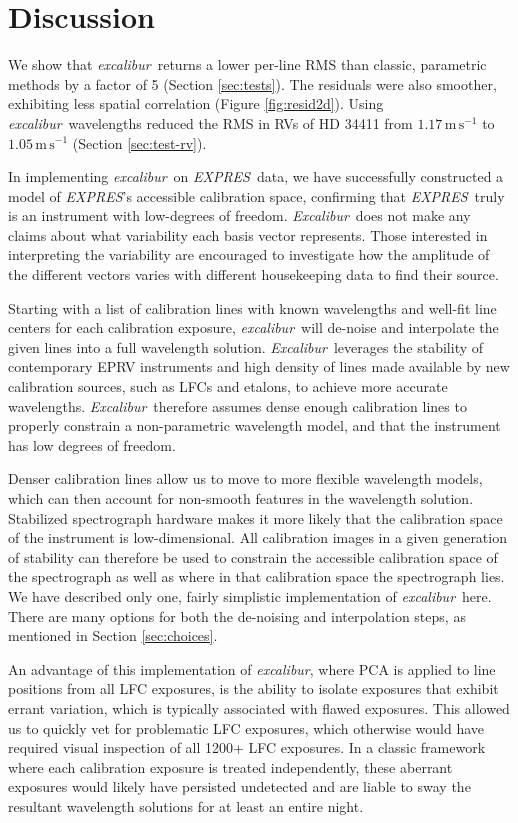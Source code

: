 \documentclass[twocolumn,table,xcolor,trackchanges]{aastex63}
\newcommand{\project}[1]{\textsl{#1}}
\newcommand{\name}{\project{excalibur}}
\newcommand{\Name}{\project{Excalibur}}
\newcommand{\acronym}[1]{{\small{#1}}}
\newcommand{\expres}{\project{\acronym{EXPRES}}}
\newcommand{\mps}{\mathrm{m\,s^{-1}}}
\begin{document}
\section{Discussion} \label{sec:discussion}
We show that \name\ returns a lower per-line RMS than classic, parametric methods by a factor of 5 (Section \ref{sec:tests}).  The residuals were also smoother, exhibiting less spatial correlation (Figure \ref{fig:resid2d}).  Using \name\ wavelengths reduced the RMS in RVs of HD 34411 from $1.17\, \mps$ to $1.05\, \mps$ (Section \ref{sec:test-rv}).

In implementing \name\ on \expres\ data, we have successfully constructed a model of \expres's accessible calibration space, confirming that \expres\ truly is an instrument with low-degrees of freedom.  \Name\ does not make any claims about what variability each basis vector represents.  Those interested in interpreting the variability are encouraged to investigate how the amplitude of the different vectors varies with different housekeeping data to find their source.

Starting with a list of calibration lines with known wavelengths and well-fit line centers for each calibration exposure, \name\ will de-noise and interpolate the given lines into a full wavelength solution.  \Name\ leverages the stability of contemporary EPRV instruments and high density of lines made available by new calibration sources, such as LFCs and etalons, to achieve more accurate wavelengths.  \Name\ therefore assumes dense enough calibration lines to properly constrain a non-parametric wavelength model, and that the instrument has low degrees of freedom.

Denser calibration lines allow us to move to more flexible wavelength models, which can then account for non-smooth features in the wavelength solution.  Stabilized spectrograph hardware makes it more likely that the calibration space of the instrument is low-dimensional.  All calibration images in a given generation of stability can therefore be used to constrain the accessible calibration space of the spectrograph as well as where in that calibration space the spectrograph lies.  We have described only one, fairly simplistic implementation of \name\ here.  There are many options for both the de-noising and interpolation steps, as mentioned in Section \ref{sec:choices}.

An advantage of this implementation of \name, where PCA is applied to line positions from all LFC exposures, is the ability to isolate exposures that exhibit errant variation, which is typically associated with flawed exposures.  This allowed us to quickly vet for problematic LFC exposures, which otherwise would have required visual inspection of all 1200+ LFC exposures.  In a classic framework where each calibration exposure is treated independently, these aberrant exposures would likely have persisted undetected and are liable to sway the resultant wavelength solutions for at least an entire night.
\end{document}
